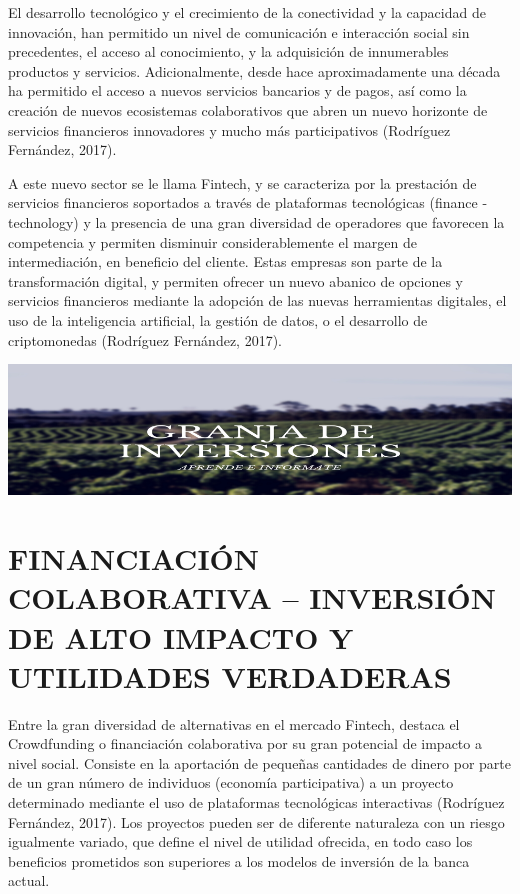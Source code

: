 \documentclass[
]{book}
\begin{document}
El desarrollo tecnológico y el crecimiento de la conectividad y la capacidad de innovación, han permitido un nivel de comunicación e interacción social sin precedentes, el acceso al conocimiento, y la adquisición de innumerables productos y servicios. Adicionalmente, desde hace aproximadamente una década ha permitido el acceso a nuevos servicios bancarios y de pagos, así como la creación de nuevos ecosistemas colaborativos que abren un nuevo horizonte de servicios financieros innovadores y mucho más participativos (Rodríguez Fernández, 2017).

A este nuevo sector se le llama Fintech, y se caracteriza por la prestación de servicios financieros soportados a través de plataformas tecnológicas (finance - technology) y la presencia de una gran diversidad de operadores que favorecen la competencia y permiten disminuir considerablemente el margen de intermediación, en beneficio del cliente. Estas empresas son parte de la transformación digital, y permiten ofrecer un nuevo abanico de opciones y servicios financieros mediante la adopción de las nuevas herramientas digitales, el uso de la inteligencia artificial, la gestión de datos, o el desarrollo de criptomonedas (Rodríguez Fernández, 2017).

\includegraphics[width=1\linewidth,height=0.3\textheight]{imagenes/Granja1}

\hypertarget{financiaciuxf3n-colaborativa-inversiuxf3n-de-alto-impacto-y-utilidades-verdaderas}{%
\chapter{FINANCIACIÓN COLABORATIVA -- INVERSIÓN DE ALTO IMPACTO Y UTILIDADES VERDADERAS}\label{financiaciuxf3n-colaborativa-inversiuxf3n-de-alto-impacto-y-utilidades-verdaderas}}

Entre la gran diversidad de alternativas en el mercado Fintech, destaca el Crowdfunding o financiación colaborativa por su gran potencial de impacto a nivel social. Consiste en la aportación de pequeñas cantidades de dinero por parte de un gran número de individuos (economía participativa) a un proyecto determinado mediante el uso de plataformas tecnológicas interactivas (Rodríguez Fernández, 2017). Los proyectos pueden ser de diferente naturaleza con un riesgo igualmente variado, que define el nivel de utilidad ofrecida, en todo caso los beneficios prometidos son superiores a los modelos de inversión de la banca actual.
\end{document}
